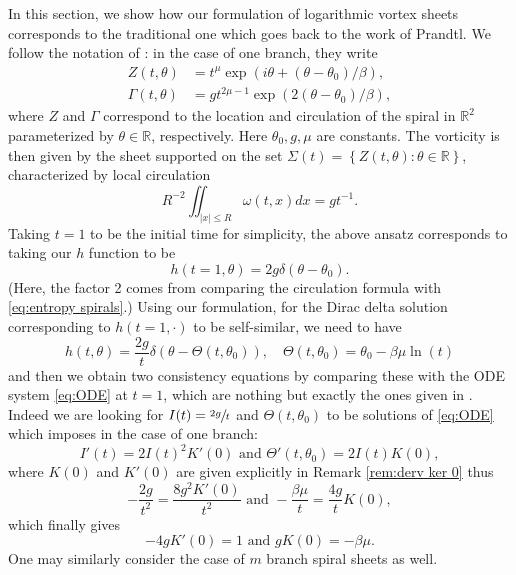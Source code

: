 \documentclass[10pt]{amsart}
\theoremstyle{plain}
\theoremstyle{definition}
\let\bt\beta
\let\Gmm\Gamma
\let\dlt\delta
\let\tht\theta
\let\omg\omega
\newcommand{\bbR}{\mathbb R}
\begin{document}
In this section, we show how our formulation of logarithmic vortex sheets corresponds to the traditional one which goes back to the work of Prandtl. We follow the notation of \cite{CKW21,CKW22}: in the case of one branch, they write
\begin{equation*}
\begin{split}
Z(t,\tht) & = t^{\mu} \exp(i\tht + (\tht-\tht_{0})/\beta), \\
\Gmm(t,\tht) & = g t^{2\mu - 1} \exp(2(\tht-\tht_{0})/\beta),
\end{split}
\end{equation*}
where $Z$ and $\Gmm$ correspond to the location and circulation of the spiral in $\bbR^2$ parameterized by $\tht\in \bbR$, respectively. Here $\tht_{0},g,\mu$ are constants. The vorticity is then given by the sheet supported on the set $\Sigma(t) = \left\{ Z(t,\tht) : \tht \in \bbR \right\} $, characterized by local circulation
\begin{equation*}
R^{-2}\iint_{|x|\le R} \omg(t,x) dx = gt^{-1}.
\end{equation*}
Taking $t = 1$ to be the initial time for simplicity, the above ansatz corresponds to taking our $h$ function to be
\begin{equation*}
h(t=1,\tht) = 2g \dlt(\tht-\tht_{0}).
\end{equation*}
(Here, the factor 2 comes from comparing the circulation formula with \eqref{eq:entropy spirals}.) Using our formulation, for the Dirac delta solution corresponding to $h(t=1,\cdot)$ to be self-similar, we need to have
\begin{equation*}
h(t,\tht) = \frac{2g}{t} \dlt(\tht - \Theta(t,\tht_{0})), \quad \Theta(t,\tht_0) = \tht_0 - \bt\mu \ln(t)
\end{equation*}
and then we obtain two consistency equations by comparing these with the ODE system \eqref{eq:ODE} at $t=1$, which are nothing but exactly the ones given in \cite[Cor.\,1.3]{CKW21}. Indeed we are looking for $I(t)=\sfrac{2g}{t}$ and $\Theta(t,\theta_0)$ to be solutions of \eqref{eq:ODE} which imposes in the case of one branch:
\[
I'(t)=2I(t)^2K'(0) \text{ and } \Theta'(t,\theta_0)=2I(t)K(0),
\]
where $K(0)$ and $K'(0)$ are given explicitly in Remark \eqref{rem:derv ker 0} thus
\[
-\frac{2g}{t^2}=\frac{8g^2 K'(0)}{t^2} \text{ and } -\frac{\beta \mu}{t}=\frac{4g}{t}K(0),
\]
which finally gives
\[
-4gK'(0)=1 \text{ and }gK(0)=-\beta\mu.
\]
One may similarly consider the case of $m$ branch spiral sheets as well.
\end{document}
